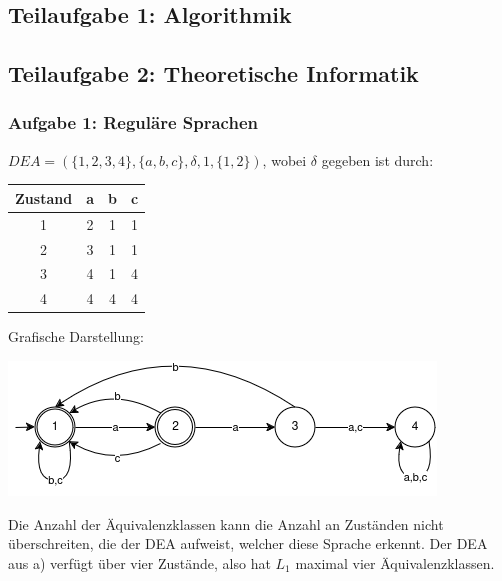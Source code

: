\subsection{Teilaufgabe 1: Algorithmik}

\subsection{Teilaufgabe 2: Theoretische Informatik}

\subsubsection{Aufgabe 1: Reguläre Sprachen}

\begin{teile}
	\item
		 
	$DEA = (\{ 1,2,3,4\},\{ a,b,c\},\delta,1,\{ 1,2\})$, wobei $\delta$ gegeben ist durch:
		
	\begin{tabular}{c|ccc}
		Zustand & a & b & c \\
		\hline
		1       & 2 & 1 & 1 \\
		2       & 3 & 1 & 1 \\
		3       & 4 & 1 & 4 \\
		4       & 4 & 4 & 4 \\
	\end{tabular} 
		
	Grafische Darstellung:
	\begin{center}
		\includegraphics[scale=0.9]{DEA.png}
	\end{center}	
			
	\item
	Die Anzahl der Äquivalenzklassen kann die Anzahl an Zuständen nicht überschreiten, die der DEA aufweist, welcher diese Sprache erkennt. Der DEA aus a) verfügt über vier Zustände, also hat $L_1$ maximal vier Äquivalenzklassen.


\end{teile}
